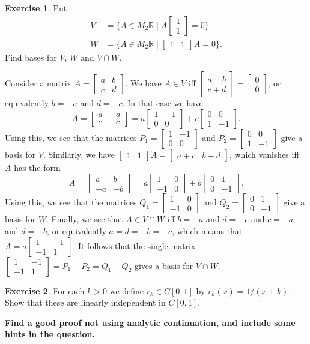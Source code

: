 \documentclass{amsart}
\newcommand{\R}         {{\mathbb{R}}}
\newcommand{\bpm}       {\left[\begin{matrix}}
\newcommand{\epm}       {\end{matrix}\right]}
\newcommand{\st}        {\;|\;}
\renewcommand{\:}{\colon}
\theoremstyle{definition}
\newtheorem{exercise}{Exercise}
\newenvironment{solution}{{\noindent \bf Solution:}}{}
\begin{document}
\begin{exercise}
 Put
 \begin{align*}
  V &= \{A\in M_2\R\st A\bpm 1\\1\epm = 0 \} \\
  W &= \{A\in M_2\R\st \bpm 1&1\epm A = 0 \}. 
 \end{align*} 
 Find bases for $V$, $W$ and $V\cap W$.
\end{exercise}
\begin{solution}
 Consider a matrix $A=\bpm a&b \\ c&d\epm$.  We have $A\in V$ iff
 $\bpm a+b\\ c+d\epm=\bpm 0\\0\epm$, or equivalently $b=-a$ and
 $d=-c$.  In that case we have
 \[ A = \bpm a&-a\\ c&-c\epm = 
        a\bpm 1&-1\\0&0\epm + c\bpm 0&0\\1&-1 \epm.
 \]
 Using this, we see that the matrices $P_1=\bpm 1&-1\\0&0\epm$ and
 $P_2=\bpm 0&0\\1&-1\epm$ give a basis for $V$.  Similarly, we have
 $\bpm 1&1\epm A=\bpm a+c&b+d\epm$, which vanishes iff $A$ has
 the form 
 \[ A = \bpm a&b\\ -a&-b\epm =
     a\bpm 1&0\\-1&0\epm + b\bpm 0&1\\ 0&-1\epm.
 \]
 Using this, we see that the matrices $Q_1=\bpm 1&0\\-1&0\epm$ and
 $Q_2=\bpm 0&1\\0&-1\epm$ give a basis for $W$.  Finally, we see
 that $A\in V\cap W$ iff $b=-a$ and $d=-c$ and $c=-a$ and $d=-b$,
 or equivalently $a=d=-b=-c$, which means that
 $A=a\bpm 1&-1\\-1&1\epm$.  It follows that the single matrix
 $\bpm 1&-1\\-1&1\epm=P_1-P_2=Q_1-Q_2$ gives a basis for
 $V\cap W$.
\end{solution}

\begin{exercise}
 For each $k>0$ we define $r_k\in C[0,1]$ by $r_k(x)=1/(x+k)$. 
 Show that these are linearly independent in $C[0,1]$.
\end{exercise}
\begin{solution}
 \textbf{Find a good proof not using analytic continuation, and 
 include some hints in the question.}
\end{solution}
\end{document}
